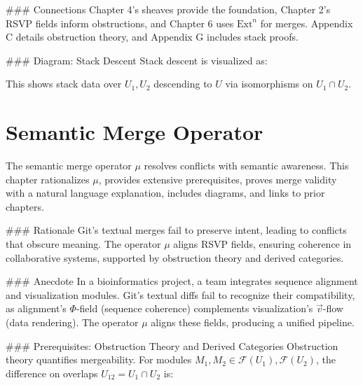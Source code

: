 \documentclass[12pt]{article}
\begin{document}
{### Connections
Chapter 4’s sheaves provide the foundation, Chapter 2’s RSVP fields inform obstructions, and Chapter 6 uses $\mathrm{Ext}^n$ for merges. Appendix C details obstruction theory, and Appendix G includes stack proofs.

### Diagram: Stack Descent
Stack descent is visualized as:

\begin{center}
\end{center}

This shows stack data over $U_1, U_2$ descending to $U$ via isomorphisms on $U_1 \cap U_2$.

\section{Semantic Merge Operator}
\label{sec:chapter6}

The semantic merge operator $\mu$ resolves conflicts with semantic awareness. This chapter rationalizes $\mu$, provides extensive prerequisites, proves merge validity with a natural language explanation, includes diagrams, and links to prior chapters.

### Rationale
Git’s textual merges fail to preserve intent, leading to conflicts that obscure meaning. The operator $\mu$ aligns RSVP fields, ensuring coherence in collaborative systems, supported by obstruction theory and derived categories.

### Anecdote
In a bioinformatics project, a team integrates sequence alignment and visualization modules. Git’s textual diffs fail to recognize their compatibility, as alignment’s $\Phi$-field (sequence coherence) complements visualization’s $\vec{v}$-flow (data rendering). The operator $\mu$ aligns these fields, producing a unified pipeline.

### Prerequisites: Obstruction Theory and Derived Categories
Obstruction theory \cite{illusie1971complexe} quantifies mergeability. For modules $M_1, M_2 \in \mathcal{F}(U_1), \mathcal{F}(U_2)$, the difference on overlaps $U_{12} = U_1 \cap U_2$ is:

}
\end{document}
